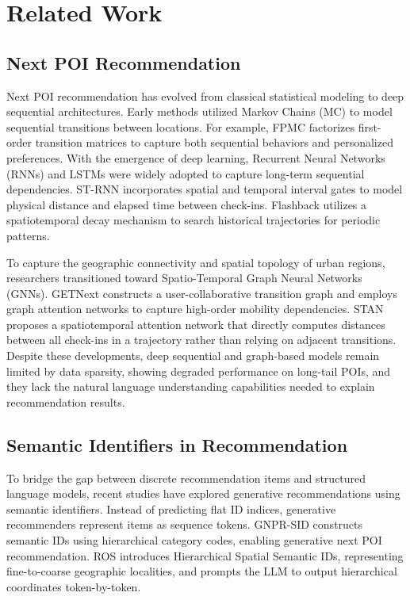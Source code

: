 \documentclass[10pt,twocolumn]{article}
\begin{document}
\section{Related Work}
\subsection{Next POI Recommendation}
Next POI recommendation has evolved from classical statistical modeling to deep sequential architectures. Early methods utilized Markov Chains (MC) to model sequential transitions between locations. For example, FPMC \cite{sasrec} factorizes first-order transition matrices to capture both sequential behaviors and personalized preferences. With the emergence of deep learning, Recurrent Neural Networks (RNNs) and LSTMs were widely adopted to capture long-term sequential dependencies. ST-RNN \cite{st_rnn} incorporates spatial and temporal interval gates to model physical distance and elapsed time between check-ins. Flashback utilizes a spatiotemporal decay mechanism to search historical trajectories for periodic patterns.

To capture the geographic connectivity and spatial topology of urban regions, researchers transitioned toward Spatio-Temporal Graph Neural Networks (GNNs). GETNext \cite{getnext} constructs a user-collaborative transition graph and employs graph attention networks to capture high-order mobility dependencies. STAN proposes a spatiotemporal attention network that directly computes distances between all check-ins in a trajectory rather than relying on adjacent transitions. Despite these developments, deep sequential and graph-based models remain limited by data sparsity, showing degraded performance on long-tail POIs, and they lack the natural language understanding capabilities needed to explain recommendation results.

\subsection{Semantic Identifiers in Recommendation}
To bridge the gap between discrete recommendation items and structured language models, recent studies have explored generative recommendations using semantic identifiers. Instead of predicting flat ID indices, generative recommenders represent items as sequence tokens. GNPR-SID \cite{gnprsid} constructs semantic IDs using hierarchical category codes, enabling generative next POI recommendation. ROS \cite{ros} introduces Hierarchical Spatial Semantic IDs, representing fine-to-coarse geographic localities, and prompts the LLM to output hierarchical coordinates token-by-token.
\end{document}
